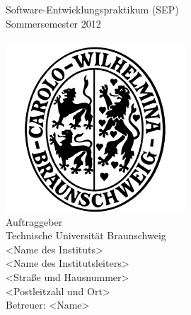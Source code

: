 

\thispagestyle{plain}      %

\begin{titlepage}

\begin{center}

{}\\[5ex]

{}\\[5ex]

Software-Entwicklungspraktikum (SEP)\\
Sommersemester 2012\\[8ex]

{}\\[5ex]

\includegraphics[scale=0.8]{bilder/carolo.jpg}\\[6ex]

Auftraggeber\\
Technische Universit\"at Braunschweig\\
<Name des Instituts>\\
<Name des Institutsleiters>\\
<Straße und Hausnummer>\\
<Postleitzahl und Ort>\\[2ex]
Betreuer: <Name>\\[5ex]


\end{center}
\end{titlepage}
